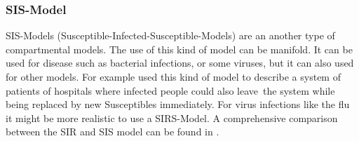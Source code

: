 \subsubsection{SIS-Model}
SIS-Models (Susceptible-Infected-Susceptible-Models) are an another type of compartmental models. The use of this kind of model can be manifold. It can be used for disease such as bacterial infections, or some viruses, but it can also used for other models. For example \citep{BEL16} used this kind of model to describe a system of patients of hospitals where infected people could also \glqq leave\grqq\ the system while being replaced by new Susceptibles immediately. For virus infections like the flu it might be more realistic to use a SIRS-Model. A comprehensive comparison between the SIR and SIS model can be found in \citep{jacquez1993stochastic}.